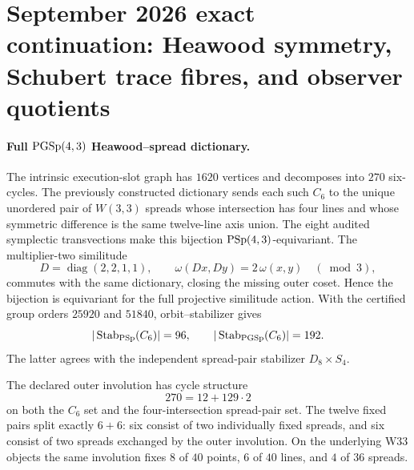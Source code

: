 
\section*{September 2026 exact continuation: Heawood symmetry, Schubert trace fibres, and observer quotients}

\paragraph{Full $\mathrm{PGSp}(4,3)$ Heawood--spread dictionary.}
The intrinsic execution-slot graph has $1620$ vertices and decomposes into
$270$ six-cycles.  The previously constructed dictionary sends each such
$C_6$ to the unique unordered pair of $W(3,3)$ spreads whose intersection has
four lines and whose symmetric difference is the same twelve-line axis union.
The eight audited symplectic transvections make this bijection
$\mathrm{PSp}(4,3)$-equivariant.  The multiplier-two similitude
\[
D=\operatorname{diag}(2,2,1,1),\qquad
\omega(Dx,Dy)=2\,\omega(x,y)\quad(\bmod 3),
\]
commutes with the same dictionary, closing the missing outer coset.  Hence the
bijection is equivariant for the full projective similitude action.  With the
certified group orders $25920$ and $51840$, orbit--stabilizer gives
\[
|\operatorname{Stab}_{\mathrm{PSp}}(C_6)|=96,
\qquad
|\operatorname{Stab}_{\mathrm{PGSp}}(C_6)|=192.
\]
The latter agrees with the independent spread-pair stabilizer
$D_8\times S_4$.

The declared outer involution has cycle structure
\[
270=12+129\cdot2
\]
on both the $C_6$ set and the four-intersection spread-pair set.  The twelve
fixed pairs split exactly $6+6$: six consist of two individually fixed spreads,
and six consist of two spreads exchanged by the outer involution.  On the
underlying W33 objects the same involution fixes $8$ of $40$ points, $6$ of
$40$ lines, and $4$ of $36$ spreads.

